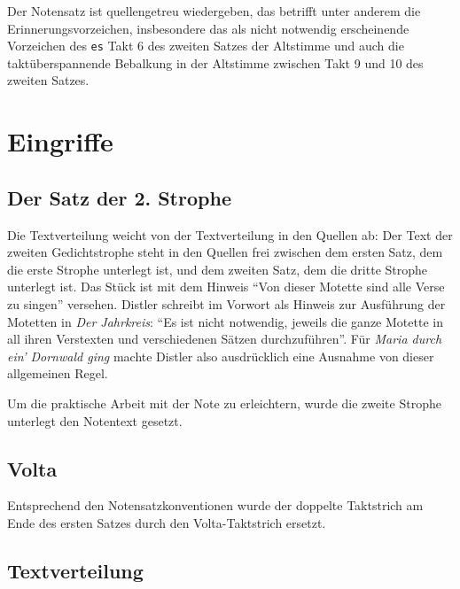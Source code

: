 \documentclass{article}
\begin{document}
\begin{multicols}{2}
Der Notensatz ist quellengetreu wiedergeben, das betrifft unter anderem
die Erinnerungsvorzeichen, insbesondere das als nicht notwendig
erscheinende Vorzeichen des \texttt{es} Takt 6 des zweiten Satzes der
Altstimme und auch die taktüberspannende Bebalkung in der Altstimme
zwischen Takt 9 und 10 des zweiten Satzes.

\section{Eingriffe}

\subsection{Der Satz der 2. Strophe}

Die Textverteilung weicht von der Textverteilung in den Quellen ab: Der
Text der zweiten Gedichtstrophe steht in den Quellen frei zwischen dem
ersten Satz, dem die erste Strophe unterlegt ist, und dem zweiten Satz,
dem die dritte Strophe unterlegt ist. Das Stück ist mit dem Hinweis
``Von dieser Motette sind alle Verse zu singen'' versehen. Distler
schreibt im Vorwort als Hinweis zur Ausführung der Motetten in \emph{Der
Jahrkreis}: ``Es ist nicht notwendig, jeweils die ganze Motette in all
ihren Verstexten und verschiedenen Sätzen durchzuführen''. Für
\emph{Maria durch ein' Dornwald ging} machte Distler also ausdrücklich
eine Ausnahme von dieser allgemeinen Regel.

Um die praktische Arbeit mit der Note zu erleichtern, wurde die zweite
Strophe unterlegt den Notentext gesetzt.

\subsection{Volta}

Entsprechend den Notensatzkonventionen wurde der doppelte Taktstrich am
Ende des ersten Satzes durch den Volta-Taktstrich ersetzt.

\subsection{Textverteilung}


\end{multicols}
\end{document}
